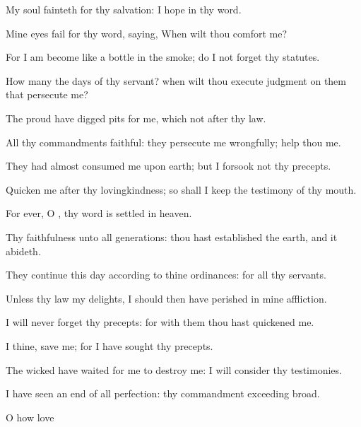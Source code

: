 {\par }{\Q {}My
soul
fainteth for thy
salvation:
{} I
hope in thy
word.
\par }{\Q {}Mine
eyes
fail for thy
word,
saying, When wilt thou
comfort me?
\par }{\Q {}For I am become like a
bottle in the
smoke;
{} do I not
forget thy
statutes.
\par }{\Q {}How many
{} the
days of thy
servant? when wilt thou
execute
judgment on them that
persecute me?
\par }{\BB \par }{\Q {}The
proud have
digged
pits for me, which
{} not after thy
law.
\par }{\Q {}All thy
commandments
{}
faithful: they
persecute me
wrongfully;
help thou me.
\par }{\Q {}They had
almost
consumed me upon
earth; but I
forsook not thy
precepts.
\par }{\Q {}Quicken me after thy
lovingkindness; so shall I
keep the
testimony of thy
mouth.
\par }{\BB \par }{
\par }{\Q {}For
ever, O
{}, thy
word is
settled in
heaven.
\par }{\Q {}Thy
faithfulness
{} unto
all
generations: thou hast
established the
earth, and it
abideth.
\par }{\Q {}They
continue this
day according to thine
ordinances: for all
{} thy
servants.
\par }{\Q {}Unless thy
law
{} my
delights, I should then have
perished in mine
affliction.
\par }{\Q {}I will
never
forget thy
precepts: for with them thou hast
quickened me.
\par }{\Q {}I
{} thine,
save me; for I have
sought thy
precepts.
\par }{\Q {}The
wicked have
waited for me to
destroy me:
{} I will
consider thy
testimonies.
\par }{\Q {}I have
seen an
end of all
perfection:
{} thy
commandment
{}
exceeding
broad.
\par }{
\par }{\Q {}O how love
}
